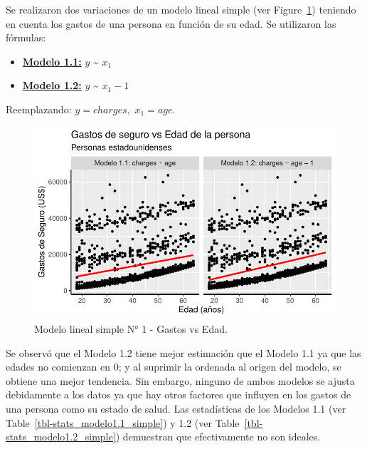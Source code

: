 \documentclass[
  letterpaper,
]{book}
\begin{document}
Se realizaron dos variaciones de un modelo lineal simple (ver
Figure~\ref{fig-modelo1_simple}) teniendo en cuenta los gastos de una
persona en función de su edad. Se utilizaron las fórmulas:

\begin{itemize}
\item
  \uline{\textbf{Modelo 1.1:}} \(y\) \textasciitilde{} \(x_1\)
\item
  \uline{\textbf{Modelo 1.2:}} \(y\) \textasciitilde{} \(x_1 - 1\)
\end{itemize}

Reemplazando: \(y = charges,\) \(x_1 = age\).

\begin{figure}

{\centering \includegraphics{./index_files/figure-pdf/fig-modelo1_simple-1.pdf}

}

\caption{\label{fig-modelo1_simple}Modelo lineal simple N° 1 - Gastos vs
Edad.}

\end{figure}

Se observó que el Modelo 1.2 tiene mejor estimación que el Modelo 1.1 ya
que las edades no comienzan en 0; y al suprimir la ordenada al origen
del modelo, se obtiene una mejor tendencia. Sin embargo, ninguno de
ambos modelos se ajusta debidamente a los datos ya que hay otros
factores que influyen en los gastos de una persona como su estado de
salud. Las estadísticas de los Modelos 1.1 (ver
Table~\ref{tbl-stats_modelo1.1_simple}) y 1.2 (ver
Table~\ref{tbl-stats_modelo1.2_simple}) demuestran que efectivamente no
son ideales.
\end{document}
